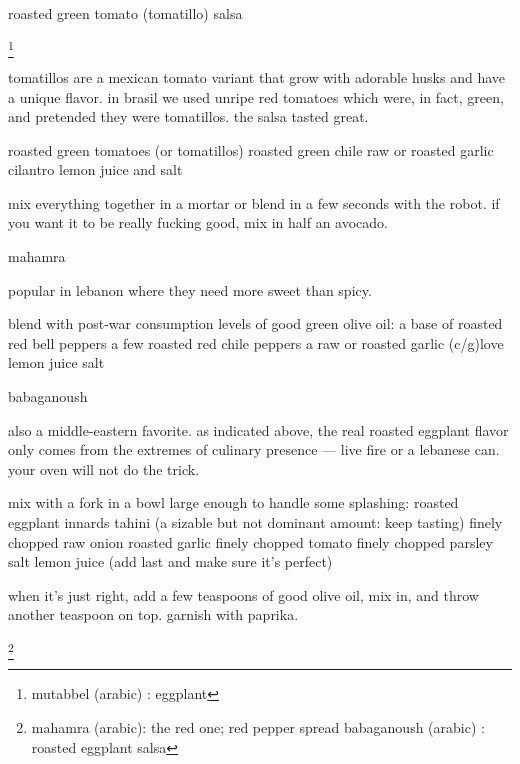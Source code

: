 roasted green tomato (tomatillo) salsa

\footnote{mutabbel (arabic) : eggplant}

tomatillos are a mexican tomato variant that grow with adorable husks and have a unique flavor. in brasil we used unripe red tomatoes which were, in fact, green, and pretended they were tomatillos. the salsa tasted great.

roasted green tomatoes (or tomatillos)
roasted green chile
raw or roasted garlic
cilantro
lemon juice and salt

mix everything together in a mortar or blend in a few seconds with the robot. if you want it to be really fucking good, mix in half an avocado.

mahamra

popular in lebanon where they need more sweet than spicy.

blend with post-war consumption levels of good green olive oil:
	a base of roasted red bell peppers
	a few roasted red chile peppers
	a raw or roasted garlic (c/g)love
	lemon juice
	salt

babaganoush

also a middle-eastern favorite. as indicated above, the real roasted eggplant flavor only comes from the extremes of culinary presence --- live fire or a lebanese can. your oven will not do the trick.

mix with a fork in a bowl large enough to handle some splashing:
	roasted eggplant innards
	tahini (a sizable but not dominant amount:
							keep tasting)
	finely chopped raw onion
	roasted garlic
	finely chopped tomato
	finely chopped parsley
	salt
	lemon juice (add last and make sure it's perfect)

when it's just right, add a few teaspoons of good olive oil, mix in, and throw another teaspoon on top. garnish with paprika.

\footnote{mahamra (arabic): the red one; red pepper spread
babaganoush (arabic) : roasted eggplant salsa}
